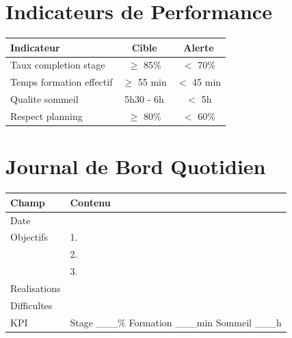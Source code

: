 \documentclass[12pt,a4paper]{article}
\begin{document}
\newpage

\section*{Indicateurs de Performance}

\begin{table}[h]
\centering
\begin{tabular}{|l|c|c|}
\hline
\rowcolor{gray!20}
\textbf{Indicateur} & \textbf{Cible} & \textbf{Alerte} \\
\hline
Taux completion stage & $\ge$ 85\% & $<$ 70\% \\
Temps formation effectif & $\ge$ 55 min & $<$ 45 min \\
Qualite sommeil & 5h30 - 6h & $<$ 5h \\
Respect planning & $\ge$ 80\% & $<$ 60\% \\
\hline
\end{tabular}
\end{table}

\newpage

\section*{Journal de Bord Quotidien}

\begin{table}[h]
\centering
\begin{tabular}{|p{3cm}|p{11cm}|}
\hline
\rowcolor{gray!20}
\textbf{Champ} & \textbf{Contenu} \\
\hline
Date & \underline{\hspace{10cm}} \\
\hline
Objectifs & 1. \underline{\hspace{8cm}} \\
& 2. \underline{\hspace{8cm}} \\
& 3. \underline{\hspace{8cm}} \\
\hline
Realisations & \underline{\hspace{11cm}} \\
\hline
Difficultes & \underline{\hspace{11cm}} \\
\hline
KPI & Stage \_\_\_\% \quad Formation \_\_\_min \quad Sommeil \_\_\_h \\
\hline
\end{tabular}
\end{table}
\end{document}
